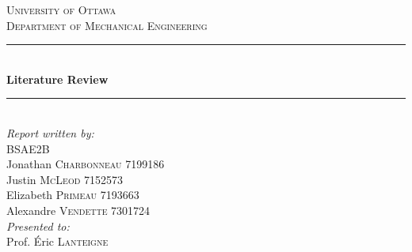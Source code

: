 \documentclass[12pt,twoside]{article}
\begin{document}
	
	\begin{titlepage}
		
		\newcommand{\HRule}{\rule{\linewidth}{0.5mm}} %
		
		\begin{center} %
			
			
			\textsc{\LARGE University of Ottawa}\\[1.5cm] %
			\textsc{\Large Department of Mechanical Engineering}\\[1.0cm] %
			
			
			\HRule \\[0.4cm]
			{ \huge \bfseries Literature Review}\\[0.4cm] %
			\HRule \\[3cm]
			
			
			
			\emph{Report written by:}\\[0.5cm]
			BSAE2B\\
			Jonathan \textsc{Charbonneau} 7199186\\
			Justin \textsc{McLeod} 7152573\\
			Elizabeth \textsc{Primeau} 7193663\\
			Alexandre \textsc{Vendette} 7301724\\[1cm]
			\emph{Presented to:}\\[0.5cm]
			Prof. Éric \textsc{Lanteigne}\\[1.5cm]
			

\end{center}
\end{titlepage}
\end{document}
